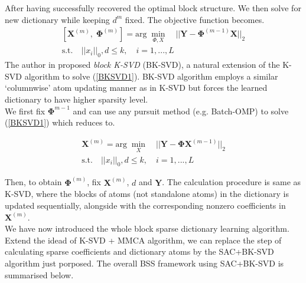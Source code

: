 After having successfully recovered the optimal block structure. We then solve for new dictionary while keeping $d^{m}$ fixed. The objective function becomes.
\begin{equation}
\begin{aligned}
    \left[\mathbf{X}^{(m)}, \;\mathbf{\Phi}^{(m)}\right] = \text{arg} \; \min_{\Phi,X} \quad || \mathbf{Y} - \mathbf{\Phi}^{(m-1)}\mathbf{X}||_2 \\
    \text{s.t.} \quad ||x_i||_0,d \leq k, \quad i = 1,...,L
\end{aligned}
\label{BKSVD1}
\end{equation}
The author in \cite{dictionary_block_sparse} proposed \textit{block K-SVD} (BK-SVD), a natural extension of the K-SVD algorithm to solve (\ref{BKSVD1}). BK-SVD algorithm employs a similar `columnwise' atom updating manner as in K-SVD but forces the learned dictionary to have higher sparsity level.\\

We first fix $\mathbf{\Phi}^{m-1}$ and can use any pursuit method (e.g. Batch-OMP) to solve (\ref{BKSVD1}) which reduces to.

\begin{equation}
\begin{aligned}
    \mathbf{X}^{(m)} = \text{arg} \; \min_X \quad || \mathbf{Y} - \mathbf{\Phi}\mathbf{X}^{(m-1)}||_2 \\
    \text{s.t.} \quad ||x_i||_0,d \leq k, \quad i = 1,...,L
\end{aligned}
\end{equation}

Then, to obtain $\mathbf{\Phi}^{(m)}$, fix $\mathbf{X}^{(m)}$, $d$ and $\mathbf{Y}$. The calculation procedure is same as K-SVD, where the blocks of atoms (not standalone atoms) in the dictionary is updated sequentially, alongside with the corresponding nonzero coefficients in $\mathbf{X}^{(m)}$.\\

We have now introduced the whole block sparse dictionary learning algorithm. Extend the idead of K-SVD + MMCA algorithm, we can replace the step of calculating sparse coefficients and dictionary atoms by the SAC+BK-SVD algorithm just porposed. The overall BSS framework using SAC+BK-SVD is summarised below.

